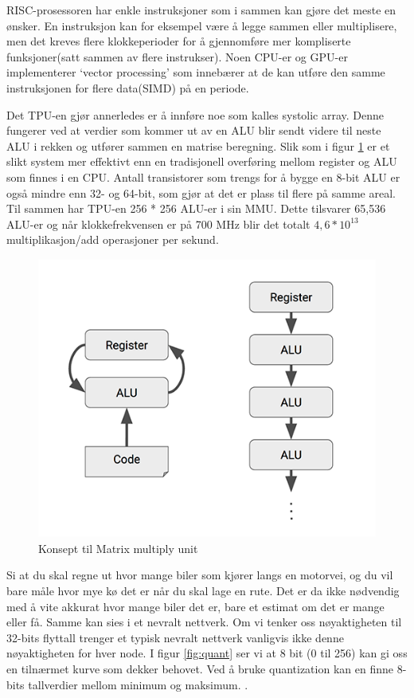 RISC-prosessoren har enkle instruksjoner som i sammen kan gjøre det meste en ønsker. En instruksjon kan for eksempel være å legge sammen eller multiplisere, men det kreves flere klokkeperioder for å gjennomføre mer kompliserte funksjoner(satt sammen av flere instrukser). Noen CPU-er og GPU-er implementerer ‘vector processing’ \cite{look_at_TPU} som innebærer at de kan utføre den samme instruksjonen for flere data(SIMD) på en periode. 

Det TPU-en gjør annerledes er å innføre noe som kalles systolic array. Denne fungerer ved at verdier som kommer ut av en ALU blir sendt videre til neste ALU i rekken og utfører sammen en matrise beregning. Slik som i figur \ref{fig:mxu} er et slikt system mer effektivt enn en tradisjonell overføring mellom register og ALU som finnes i en CPU. Antall transistorer som trengs for å bygge en 8-bit ALU er også mindre enn 32- og 64-bit, som gjør at det er plass til flere på samme areal. Til sammen har TPU-en 256 * 256 ALU-er i sin MMU\cite{look_at_TPU}. Dette tilsvarer 65,536 ALU-er og når klokkefrekvensen er på 700 MHz blir det totalt $4,6 * 10^{13}$ multiplikasjon/add operasjoner per sekund. 

\begin{figure}[hb]
    \centering
    \includegraphics[width=\textwidth]{MXU.png}
    \caption{Konsept til Matrix multiply unit}
    \label{fig:mxu}
\end{figure}

Si at du skal regne ut hvor mange biler som kjører langs en motorvei, og du vil bare måle hvor mye kø det er når du skal lage en rute. Det er da ikke nødvendig med å vite akkurat hvor mange biler det er, bare et estimat om det er mange eller få. Samme kan sies i et nevralt nettverk. Om vi tenker oss nøyaktigheten til 32-bits flyttall trenger et typisk nevralt nettverk vanligvis ikke denne nøyaktigheten for hver node. I figur \ref{fig:quant} ser vi at 8 bit (0 til 256) kan gi oss en tilnærmet kurve som dekker behovet. Ved å bruke quantization kan en finne 8-bits tallverdier mellom minimum og maksimum. \cite{look_at_TPU}.
 
